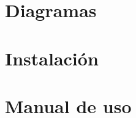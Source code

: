 \newpage
\chapter{Diagramas}
\label{chap:diagrams}
 
\chapter{Instalación}
\label{chap:installation}
\chapter{Manual de uso}
\label{chap:usage}

\newpage
\thispagestyle{empty}
